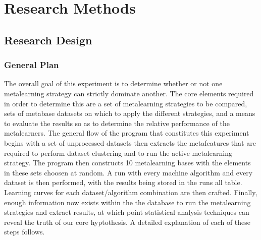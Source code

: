 \chapter{Research Methods}
\label{Chapter3}
\section{Research Design}

\subsection{General Plan}
The overall goal of this experiment is to determine whether or not one metalearning strategy can strictly
dominate another. The core elements required in order to determine this are a set of metalearning strategies to be compared, sets of metabase datasets on which to apply the different strategies, and
a means to evaluate the results so as to determine the relative performance of the metalearners. The general flow of the program that constitutes this experiment begins with a set of unprocessed datasets
then extracts the metafeatures that are required to perform dataset clustering and to run the active
metalearning strategy. The program then constructs 10 metalearning bases with the elements in these sets
choosen at random. A run with every machine algorithm and every dataset is then performed, with the results
being stored in the runs all table. Learning curves for each dataset/algorithm combination are then crafted.
Finally, enough information now exists within the the database to run the metalearning strategies and
extract results, at which point statistical analysis techniques can reveal the truth of our core
hyptothesis. A detailed explanation of each of these steps follows.

